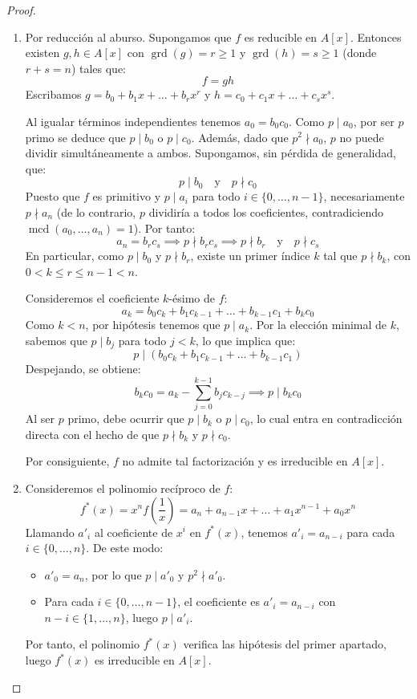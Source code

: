 \begin{proof}
    \leavevmode
    \begin{enumerate}[label=\roman*)]
        \item Por reducción al aburso. Supongamos que $f$ es reducible en $A[x]$. Entonces existen $g, h \in A[x]$ con $\operatorname{grd}(g) = r \geq 1$ y $\operatorname{grd}(h) = s \geq 1$ (donde $r + s = n$) tales que:
        \[
            f = gh
        \]
        Escribamos $g = b_0 + b_1x + \dots + b_rx^r$ y $h = c_0 + c_1x + \dots + c_sx^s$.

        Al igualar términos independientes tenemos $a_0 = b_0c_0$. Como $p \mid a_0$, por ser $p$ primo se deduce que $p \mid b_0$ o $p \mid c_0$. Además, dado que $p^2 \nmid a_0$, $p$ no puede dividir simultáneamente a ambos. Supongamos, sin pérdida de generalidad, que:
        \[
            p \mid b_0 \quad \text{y} \quad p \nmid c_0
        \]
        Puesto que $f$ es primitivo y $p \mid a_i$ para todo $i \in \{0, \dots, n-1\}$, necesariamente $p \nmid a_n$ (de lo contrario, $p$ dividiría a todos los coeficientes, contradiciendo $\operatorname{mcd}(a_0, \dots, a_n) = 1$). Por tanto:
        \[
            a_n = b_rc_s \implies p \nmid b_rc_s \implies p \nmid b_r \quad \text{y} \quad p \nmid c_s
        \]
        En particular, como $p \mid b_0$ y $p \nmid b_r$, existe un primer índice $k$ tal que $p \nmid b_k$, con $0 < k \le r \le n - 1 < n$.

        Consideremos el coeficiente $k$-ésimo de $f$:
        \[
            a_k = b_0c_k + b_1c_{k-1} + \dots + b_{k-1}c_1 + b_kc_0
        \]
        Como $k < n$, por hipótesis tenemos que $p \mid a_k$. Por la elección minimal de $k$, sabemos que $p \mid b_j$ para todo $j < k$, lo que implica que:
        \[
            p \mid (b_0c_k + b_1c_{k-1} + \dots + b_{k-1}c_1)
        \]
        Despejando, se obtiene:
        \[
            b_kc_0 = a_k - \sum_{j=0}^{k-1} b_jc_{k-j} \implies p \mid b_kc_0
        \]
        Al ser $p$ primo, debe ocurrir que $p \mid b_k$ o $p \mid c_0$, lo cual entra en contradicción directa con el hecho de que $p \nmid b_k$ y $p \nmid c_0$.

        Por consiguiente, $f$ no admite tal factorización y es irreducible en $A[x]$.

        \item Consideremos el polinomio recíproco de $f$:
        \[
            f^*(x) = x^n f\left(\frac{1}{x}\right) = a_n + a_{n-1}x + \dots + a_1x^{n-1} + a_0x^n
        \]
        Llamando $a'_i$ al coeficiente de $x^i$ en $f^*(x)$, tenemos $a'_i = a_{n-i}$ para cada $i \in \{0, \dots, n\}$. De este modo:
        \begin{itemize}
            \item $a'_0 = a_n$, por lo que $p \mid a'_0$ y $p^2 \nmid a'_0$.
            \item Para cada $i \in \{0, \dots, n-1\}$, el coeficiente es $a'_i = a_{n-i}$ con $n-i \in \{1, \dots, n\}$, luego $p \mid a'_i$.
        \end{itemize}
        Por tanto, el polinomio $f^*(x)$ verifica las hipótesis del primer apartado, luego $f^*(x)$ es irreducible en $A[x]$.


\end{enumerate}
\end{proof}
